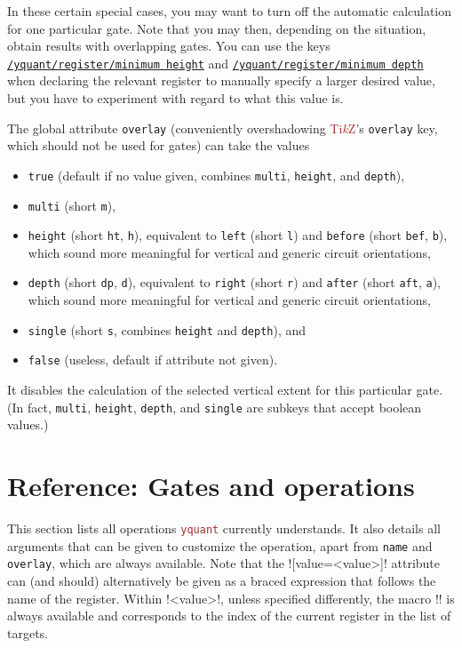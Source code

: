 \documentclass{scrartcl}
\makeatletter
\def\TikZ{\textcolor{brown}{Ti\textit kZ}}
\def\pkg#1{\textcolor{brown}{\texttt{#1}}}
\def\style#1{\hyperref[style:#1]{\texttt{#1}}}
\def\Yquant{\pkg{yquant}}
\newcommand*{\the@orig@section}{}
\let\the@orig@section=\section
\renewcommand*{\section}{%
   \clearpage%
   \the@orig@section%
}
\makeatother
\begin{document}
         In these certain special cases, you may want to turn off the automatic calculation for one particular gate.
         Note that you may then, depending on the situation, obtain results with overlapping gates.
         You can use the keys \style{/yquant/register/minimum height} and \style{/yquant/register/minimum depth} when declaring the relevant register to manually specify a larger desired value, but you have to experiment with regard to what this value is.

         The global attribute \texttt{overlay} (conveniently overshadowing \TikZ's \texttt{overlay} key, which should not be used for gates) can take the values
         \begin{itemize}
            \item \texttt{true} (default if no value given, combines \texttt{multi}, \texttt{height}, and \texttt{depth}),
            \item \texttt{multi} (short \texttt{m}),
            \item \texttt{height} (short \texttt{ht}, \texttt{h}), equivalent to \texttt{left} (short \texttt{l}) and \texttt{before} (short \texttt{bef}, \texttt{b}), which sound more meaningful for vertical and generic circuit orientations,
            \item \texttt{depth} (short \texttt{dp}, \texttt{d}), equivalent to \texttt{right} (short \texttt{r}) and \texttt{after} (short \texttt{aft}, \texttt{a}), which sound more meaningful for vertical and generic circuit orientations,
            \item \texttt{single} (short \texttt{s}, combines \texttt{height} and \texttt{depth}), and
            \item \texttt{false} (useless, default if attribute not given).
         \end{itemize}
         It disables the calculation of the selected vertical extent for this particular gate.
         (In fact, \texttt{multi}, \texttt{height}, \texttt{depth}, and \texttt{single} are subkeys that accept boolean values.)

   \section{Reference: Gates and operations}\label{sec:gates}
      This section lists all operations \Yquant{} currently understands.
      It also details all arguments that can be given to customize the operation, apart from \texttt{name} and \texttt{overlay}, which are always available.
      Note that the \tex![value=<value>]! attribute can (and should) alternatively be given as a braced expression that follows the name of the register.
      Within \tex!<value>!, unless specified differently, the macro \tex!\idx! is always available and corresponds to the index of the current register in the list of targets.
\end{document}

